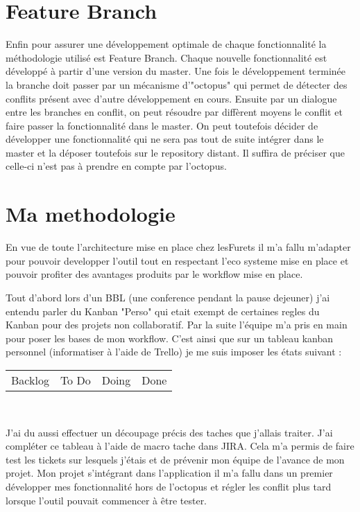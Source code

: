 \section{Feature Branch}
Enfin pour assurer une développement optimale de chaque fonctionnalité la méthodologie utilisé est Feature Branch. Chaque nouvelle fonctionnalité est développé à partir d'une version du master. Une fois le développement terminée la branche doit passer par un mécanisme d'"octopus" qui permet de détecter des conflits présent avec d'autre développement en cours. Ensuite par un dialogue entre les branches en conflit, on peut résoudre par diffèrent moyens le conflit et faire passer la fonctionnalité dans le master. On peut toutefois décider de développer une fonctionnalité qui ne sera pas tout de suite intégrer dans le master et la déposer toutefois sur le repository distant. Il suffira de préciser que celle-ci n'est pas à prendre en compte par l'octopus.

\section{Ma methodologie}
En vue de toute l'architecture mise en place chez lesFurets il m'a fallu m'adapter pour pouvoir developper l'outil tout en respectant l'eco systeme mise en place et pouvoir profiter des avantages produits par le workflow mise en place.

Tout d'abord lors d'un BBL (une conference pendant la pause dejeuner) j'ai entendu parler du Kanban "Perso" qui etait exempt de certaines regles du Kanban pour des projets non collaboratif. Par la suite l'équipe m'a pris en main pour poser les bases de mon workflow. 
C'est ainsi que sur un tableau kanban personnel (informatiser à l'aide de Trello) je me suis imposer les états suivant : \\
\begin{center}
\begin{tabular}{|c|c|c|c|}
\hline
 Backlog & To Do & Doing & Done\\
\end{tabular} \\
\end{center}
J'ai du aussi effectuer un découpage précis des taches que j'allais traiter. J'ai compléter ce tableau à l'aide de macro tache dans JIRA. Cela m'a permis de faire test les tickets sur lesquels j'étais et de prévenir mon équipe de l'avance de mon projet. Mon projet s'intégrant dans l'application il m'a fallu dans un premier développer mes fonctionnalité hors de l'octopus et régler les conflit plus tard lorsque l'outil pouvait commencer à être tester.